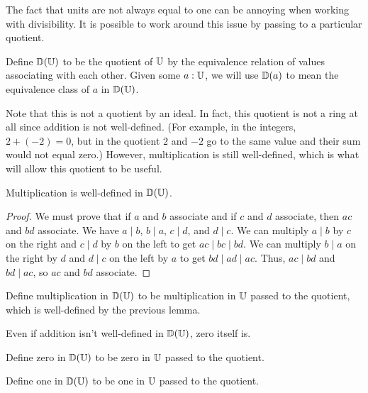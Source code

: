 \documentclass[../../math.tex]{subfiles}
\begin{document}
The fact that units are not always equal to one can be annoying when working
with divisibility.  It is possible to work around this issue by passing to a
particular quotient.

\begin{definition}
    Define $\mathbb{D}(\mathbb{U})$ to be the quotient of $\mathbb{U}$ by the equivalence relation of
    values associating with each other.  Given some $a : \mathbb{U}$, we will use
    $\mathbb{D}(a)$ to mean the equivalence class of $a$ in $\mathbb{D}(\mathbb{U})$.
\end{definition}

Note that this is not a quotient by an ideal.  In fact, this quotient is not a
ring at all since addition is not well-defined.  (For example, in the integers,
$2 + (-2) = 0$, but in the quotient $2$ and $-2$ go to the same value and their
sum would not equal zero.)  However, multiplication is still well-defined, which
is what will allow this quotient to be useful.

\begin{lemma}
    Multiplication is well-defined in $\mathbb{D}(\mathbb{U})$.
\end{lemma}
\begin{proof}
    We must prove that if $a$ and $b$ associate and if $c$ and $d$ associate,
    then $ac$ and $bd$ associate.  We have $a \mid b$, $b \mid a$, $c \mid d$,
    and $d \mid c$.  We can multiply $a \mid b$ by $c$ on the right and $c \mid
    d$ by $b$ on the left to get $ac \mid bc \mid bd$.  We can multiply $b \mid
    a$ on the right by $d$ and $d \mid c$ on the left by $a$ to get $bd \mid ad
    \mid ac$.  Thus, $ac \mid bd$ and $bd \mid ac$, so $ac$ and $bd$ associate.
\end{proof}

\begin{instance}
    Define multiplication in $\mathbb{D}(\mathbb{U})$ to be multiplication in $\mathbb{U}$ passed to the
    quotient, which is well-defined by the previous lemma.
\end{instance}

Even if addition isn't well-defined in $\mathbb{D}(\mathbb{U})$, zero itself is.

\begin{instance}
    Define zero in $\mathbb{D}(\mathbb{U})$ to be zero in $\mathbb{U}$ passed to the quotient.
\end{instance}

\begin{instance}
    Define one in $\mathbb{D}(\mathbb{U})$ to be one in $\mathbb{U}$ passed to the quotient.
\end{instance}
\end{document}
